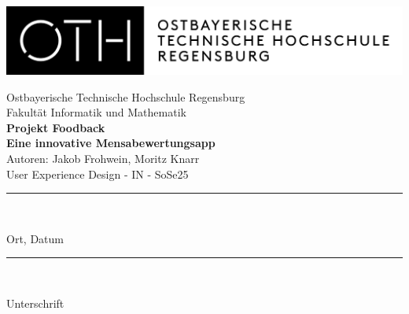 \documentclass[12pt, a4paper]{scrreprt}
\begin{document}
\setlength{\parskip}{1em}
\begin{titlepage}
    \begin{center}
    	\includegraphics[width=\textwidth]{Bilder/logo_oth_Regensburg.png}
    \end{center}
    \vspace*{\baselineskip}
    \begin{center}
        {Ostbayerische Technische Hochschule Regensburg \\
    	Fakultät Informatik und Mathematik} \\
    	\vspace{2cm}
    	\Large \textbf{Projekt Foodback} \\
        \small \textbf{Eine innovative Mensabewertungsapp} \\
        \normalsize
        \vspace{2cm}
         Autoren: Jakob Frohwein, Moritz Knarr   \\
        \vspace{2cm}
        \vspace{0.5cm}
        User Experience Design - IN - SoSe25 \\
        \end{center}
     \vspace{7cm}
    \parbox{4cm}{%
    \rule{4cm}{1pt}\\
    \centerline{Ort, Datum}%
    }\hfill
       \parbox{5cm}{%
       \rule{5cm}{1pt}\\
    \centerline{Unterschrift}%
    }
\end{titlepage}



\tableofcontents
{}











\cleardoublepage
{}
\listoffigures


\printbibliography[heading=bibintoc,title={Quellenverzeichnis}]
\printbibliography[heading=subbibintoc,type=article,title={Articles only}]
\end{document}
